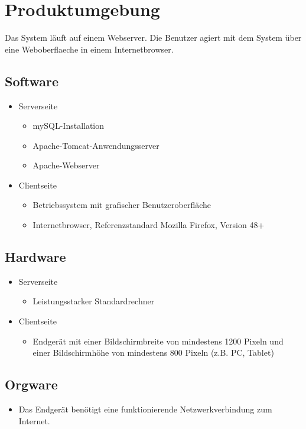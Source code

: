 \section{Produktumgebung}
Das System läuft auf einem Webserver. Die \gls{Benutzer} agiert mit dem System über eine \gls{Weboberflaeche} in einem \gls{Internetbrowser}.
\subsection{Software}
\begin{itemize}
	\item Serverseite
	\begin{itemize}
		\item mySQL-Installation
		\item Apache-Tomcat-Anwendungsserver
		\item Apache-Webserver
	\end{itemize}
	\item Clientseite
	\begin{itemize}
		\item Betriebssystem mit grafischer Benutzeroberfläche
		\item \gls{Internetbrowser}, Referenzstandard Mozilla Firefox, Version 48+
	\end{itemize}
\end{itemize}
\subsection{Hardware}
\begin{itemize}
	\item Serverseite
	\begin{itemize}
		\item Leistungsstarker Standardrechner
	\end{itemize}
	\item Clientseite
	\begin{itemize}
		\item Endgerät mit einer Bildschirmbreite von mindestens 1200 Pixeln und einer Bildschirmhöhe von mindestens 800 Pixeln (z.B. PC, Tablet)
	\end{itemize}
\end{itemize}
\subsection{Orgware}
\begin{itemize}
	\item Das Endgerät benötigt eine funktionierende Netzwerkverbindung zum Internet.
\end{itemize}